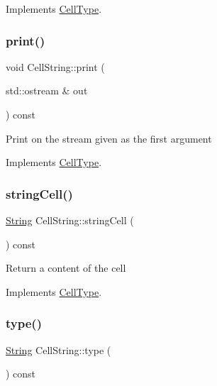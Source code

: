 Implements \hyperlink{class_cell_type_a1f8bd268dbd474dd8e08726a6efac066}{Cell\+Type}.

\mbox{\label{class_cell_string_a13f416bd887f2cbceb93273316d16d65}} 
\subsubsection{\texorpdfstring{print()}{print()}}
{\footnotesize\ttfamily void Cell\+String\+::print (\begin{DoxyParamCaption}\item[{std\+::ostream \&}]{out }\end{DoxyParamCaption}) const\hspace{0.3cm}{\ttfamily [virtual]}}

Print on the stream given as the first argument 

Implements \hyperlink{class_cell_type_a34413fcb76f292b6b8d08615765ba894}{Cell\+Type}.

\mbox{\label{class_cell_string_ac601c93ecb70391eae65236c56c561a5}} 
\subsubsection{\texorpdfstring{string\+Cell()}{stringCell()}}
{\footnotesize\ttfamily \hyperlink{class_string}{String} Cell\+String\+::string\+Cell (\begin{DoxyParamCaption}{ }\end{DoxyParamCaption}) const\hspace{0.3cm}{\ttfamily [virtual]}}

Return a content of the cell 

Implements \hyperlink{class_cell_type_abba4d6d43efa340144d1ad09637e1aa9}{Cell\+Type}.

\mbox{\label{class_cell_string_a0670fd5a35f8e05c985379acd5e4b88f}} 
\subsubsection{\texorpdfstring{type()}{type()}}
{\footnotesize\ttfamily \hyperlink{class_string}{String} Cell\+String\+::type (\begin{DoxyParamCaption}{ }\end{DoxyParamCaption}) const\hspace{0.3cm}{\ttfamily [virtual]}}

